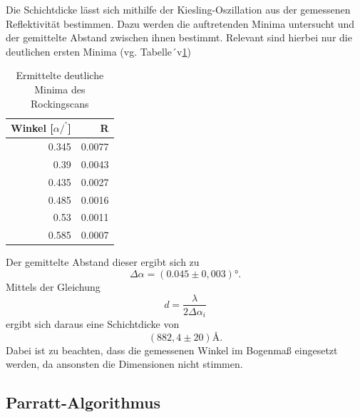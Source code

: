 Die Schichtdicke lässt sich mithilfe der Kiesling-Oszillation aus der gemessenen Reflektivität bestimmen.
Dazu werden die auftretenden Minima untersucht und der gemittelte Abstand zwischen ihnen bestimmt.
Relevant sind hierbei nur die deutlichen ersten Minima (vg. Tabelle´v\ref{tab:scan})
\begin{table}
    \centering
    \caption{Ermittelte deutliche Minima des Rockingscans} 
    \label{tab:scan}
    \begin{tabular}{ r | r}
        \hline			
        Winkel [$\alpha/^°$] & R \\
        \hline
        0.345  & 0.0077  \\
        0.39   & 0.0043  \\
        0.435  & 0.0027  \\
        0.485  & 0.0016  \\
        0.53   & 0.0011  \\
        0.585  & 0.0007  \\
    \hline  
  \end{tabular}
\end{table}

Der gemittelte Abstand dieser ergibt sich zu
\begin{equation}
    \Delta\alpha = (0.045 \pm 0,003)°.
\end{equation}
Mittels der Gleichung
\begin{equation}
    d = \frac{\lambda}{2\Delta\alpha_i}
\end{equation}
ergibt sich daraus eine Schichtdicke von
\begin{equation}
    (882,4 \pm 20) \text{\AA}.
\end{equation}
Dabei ist zu beachten, 
dass die gemessenen Winkel im Bogenmaß eingesetzt werden,
da ansonsten die Dimensionen nicht stimmen.

\subsection{Parratt-Algorithmus}

